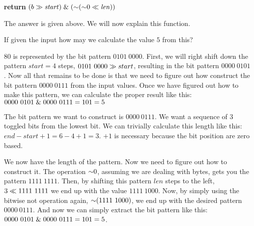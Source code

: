 \begin{Answer}[ref={getbits}]

  \begin{algorithmic}[1]
    \State \textbf{return} $(b \gg \mathit{start}) \mathrel{\&} (\mathord{\sim}
    (\mathord{\sim} 0 \ll \mathit{len}))$
    \EndProcedure
  \end{algorithmic}

  The answer is given above. We will now explain this function.

  If given the input  how may we calculate
  the value $5$ from this?

  $80$ is represented by the bit pattern $0101\ 0000$. First, we will
  right shift down the pattern $start=4$ steps, $0101\ 0000 \gg
  start$, resulting in the bit pattern $0000\ 0101$. Now all that
  remains to be done is that we need to figure out how construct the
  bit pattern $0000\ 0111$ from the input values. Once we have figured
  out how to make this pattern, we can calculate the proper result
  like this: $0000\ 0101 \mathrel{\&} 0000\ 0111 = 101 = 5$

  The bit pattern we want to construct is $0000\ 0111$. We want a
  sequence of $3$ toggled bits from the lowest bit. We can trivially
  calculate this length like this: $end - start + 1 = 6 - 4 + 1 = 3$.
  $ + 1$ is necessary because the bit position are zero based.

  We now have the length of the pattern. Now we need to figure out how
  to construct it. The operation $\mathord{\sim} 0$, assuming we are dealing
  with bytes, gets you the pattern $1111\ 1111$. Then, by shifting
  this pattern $len$ steps to the left, $3 \ShiftLeft 1111\ 1111$ we
  end up with the value $1111\ 1000$. Now, by simply using the bitwise
  not operation again, $\mathord{\sim} (1111\ 1000)$, we end up with the
  desired pattern $0000\ 0111$. And now we can simply extract the bit
  pattern like this: $0000\ 0101 \mathrel{\&} 0000\ 0111 = 101 = 5$.

\end{Answer}

